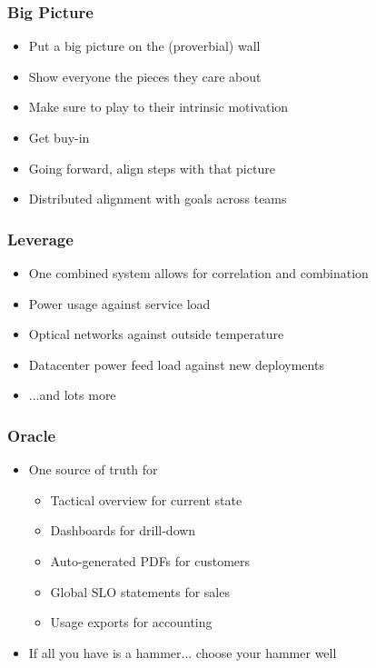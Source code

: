 \documentclass[t]{beamer}
\begin{document}
\begin{frame}
	\frametitle{Big Picture}
	\begin{itemize}
		\item Put a big picture on the (proverbial) wall
		\item Show everyone the pieces they care about
		\item Make sure to play to their intrinsic motivation
		\item Get buy-in
		\item Going forward, align steps with that picture
		\item Distributed alignment with goals across teams
	\end{itemize}
\end{frame}

\begin{frame}
	\frametitle{Leverage}
	\begin{itemize}
		\item One combined system allows for correlation and combination
		\item Power usage against service load
		\item Optical networks against outside temperature
		\item Datacenter power feed load against new deployments
		\item ...and lots more
	\end{itemize}
\end{frame}

\begin{frame}
	\frametitle{Oracle}
	\begin{itemize}
		\item One source of truth for
		\begin{itemize}
			\item Tactical overview for current state
			\item Dashboards for drill-down
			\item Auto-generated PDFs for customers
			\item Global SLO statements for sales
			\item Usage exports for accounting
		\end{itemize}
	\item If all you have is a hammer... choose your hammer well
	\end{itemize}
\end{frame}
\end{document}
